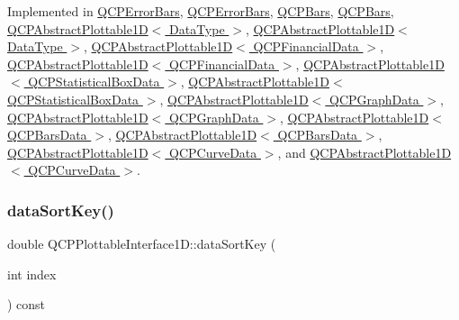Implemented in \hyperlink{class_q_c_p_error_bars_a7397bc40751c9c6e2ea188895b2152f8}{Q\+C\+P\+Error\+Bars}, \hyperlink{class_q_c_p_error_bars_ac50601b6860b0801e2d127dfa5709bc8}{Q\+C\+P\+Error\+Bars}, \hyperlink{class_q_c_p_bars_a55cdaf565cd3384158d1f7f89533bc2d}{Q\+C\+P\+Bars}, \hyperlink{class_q_c_p_bars_a71faeb70a3834f1f391c1a7e11c9fce7}{Q\+C\+P\+Bars}, \hyperlink{class_q_c_p_abstract_plottable1_d_a14cf167457cda163575e6eec2a0b178d}{Q\+C\+P\+Abstract\+Plottable1\+D$<$ Data\+Type $>$}, \hyperlink{class_q_c_p_abstract_plottable1_d_abc363be6268d4547aa5324cb88138f30}{Q\+C\+P\+Abstract\+Plottable1\+D$<$ Data\+Type $>$}, \hyperlink{class_q_c_p_abstract_plottable1_d_a14cf167457cda163575e6eec2a0b178d}{Q\+C\+P\+Abstract\+Plottable1\+D$<$ Q\+C\+P\+Financial\+Data $>$}, \hyperlink{class_q_c_p_abstract_plottable1_d_abc363be6268d4547aa5324cb88138f30}{Q\+C\+P\+Abstract\+Plottable1\+D$<$ Q\+C\+P\+Financial\+Data $>$}, \hyperlink{class_q_c_p_abstract_plottable1_d_a14cf167457cda163575e6eec2a0b178d}{Q\+C\+P\+Abstract\+Plottable1\+D$<$ Q\+C\+P\+Statistical\+Box\+Data $>$}, \hyperlink{class_q_c_p_abstract_plottable1_d_abc363be6268d4547aa5324cb88138f30}{Q\+C\+P\+Abstract\+Plottable1\+D$<$ Q\+C\+P\+Statistical\+Box\+Data $>$}, \hyperlink{class_q_c_p_abstract_plottable1_d_a14cf167457cda163575e6eec2a0b178d}{Q\+C\+P\+Abstract\+Plottable1\+D$<$ Q\+C\+P\+Graph\+Data $>$}, \hyperlink{class_q_c_p_abstract_plottable1_d_abc363be6268d4547aa5324cb88138f30}{Q\+C\+P\+Abstract\+Plottable1\+D$<$ Q\+C\+P\+Graph\+Data $>$}, \hyperlink{class_q_c_p_abstract_plottable1_d_a14cf167457cda163575e6eec2a0b178d}{Q\+C\+P\+Abstract\+Plottable1\+D$<$ Q\+C\+P\+Bars\+Data $>$}, \hyperlink{class_q_c_p_abstract_plottable1_d_abc363be6268d4547aa5324cb88138f30}{Q\+C\+P\+Abstract\+Plottable1\+D$<$ Q\+C\+P\+Bars\+Data $>$}, \hyperlink{class_q_c_p_abstract_plottable1_d_a14cf167457cda163575e6eec2a0b178d}{Q\+C\+P\+Abstract\+Plottable1\+D$<$ Q\+C\+P\+Curve\+Data $>$}, and \hyperlink{class_q_c_p_abstract_plottable1_d_abc363be6268d4547aa5324cb88138f30}{Q\+C\+P\+Abstract\+Plottable1\+D$<$ Q\+C\+P\+Curve\+Data $>$}.

\mbox{\label{class_q_c_p_plottable_interface1_d_afdc92f9f01e7e35f2e96b2ea9dc14ae7}} 
\subsubsection{\texorpdfstring{data\+Sort\+Key()}{dataSortKey()}}
{\footnotesize\ttfamily double Q\+C\+P\+Plottable\+Interface1\+D\+::data\+Sort\+Key (\begin{DoxyParamCaption}\item[{int}]{index }\end{DoxyParamCaption}) const\hspace{0.3cm}{\ttfamily [pure virtual]}}


